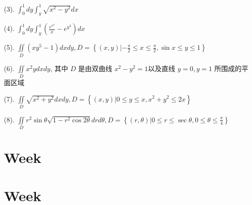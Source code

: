 (3). $\int_{0}^{1}dy\int_{y}^{1}\sqrt{x^{2}-y^{2}}dx$

(4). $\int_{0}^{1}dy\int_{y}^{1}\left(\frac{e^{x^{2}}}{x}-e^{y^{3}}\right)dx$

(5). $\iint\limits_{D}\left(xy^{5}-1\right)dxdy,D=\left\{(x,y)|-\frac{\pi}{2}\leq x \leq \frac{\pi}{2},\sin x\leq y \leq 1 \right\}$

(6). $\iint\limits_{D}x^{2}ydxdy$, 其中 $D$ 是由双曲线 $x^{2}-y^{2}=1$以及直线 $y=0,y=1$ 所围成的平面区域

(7). $\iint\limits_{D}\sqrt{x^{2}+y^{2}}dxdy,D=\left\{(x,y)|0\leq y \leq x, x^{2}+y^{2}\leq 2x\right\}$

(8). $\iint\limits_{D}r^{2}\sin\theta\sqrt{1-r^{2}\cos 2\theta}drd\theta,D=\left\{(r,\theta)|0\leq r\leq \sec\theta,0\leq \theta \leq \frac{\pi}{4}\right\}$


\section{Week }

\section{Week }

